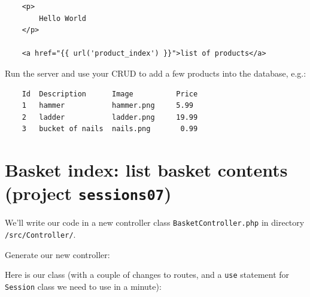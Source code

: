 \documentclass[a4paperpaper,openright]{book}
\newenvironment{Shaded}{}{}
\newcommand{\ExtensionTok}[1]{#1}
\newcommand{\NormalTok}[1]{#1}
\begin{document}
\begin{verbatim}
    <p>
        Hello World
    </p>

    <a href="{{ url('product_index') }}">list of products</a>
\end{verbatim}

Run the server and use your CRUD to add a few products into the
database, e.g.:

\begin{verbatim}
    Id  Description      Image          Price
    1   hammer           hammer.png     5.99
    2   ladder           ladder.png     19.99
    3   bucket of nails  nails.png       0.99
\end{verbatim}

\hypertarget{basket-index-list-basket-contents-project-sessions07}{%
\section{\texorpdfstring{Basket index: list basket contents (project
\texttt{sessions07})}{Basket index: list basket contents (project sessions07)}}\label{basket-index-list-basket-contents-project-sessions07}}

We'll write our code in a new controller class
\texttt{BasketController.php} in directory \texttt{/src/Controller/}.

Generate our new controller:

\begin{Shaded}
\end{Shaded}

Here is our class (with a couple of changes to routes, and a
\texttt{use} statement for \texttt{Session} class we need to use in a
minute):
\end{document}
